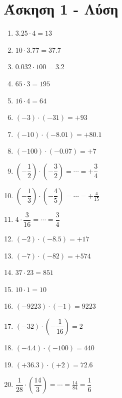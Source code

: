 \documentclass[a4paper,10pt]{report}
\begin{document}
\section*{Άσκηση 1  - Λύση \hfill \small{}}
\begin{multicols}{2}
\begin{enumerate}[1)]
 \item $3.25\cdot 4=13$
 \item $10\cdot 3.77=37.7$
 \item $0.032\cdot100=3.2$
 \item $65\cdot3=195$
 \item $16\cdot4=64$
 \item $(-3)\cdot(-31)=+93$
 \item $(-10)\cdot(-8.01)=+80.1$
 \item $(-100)\cdot(-0.07)=+7$
 \item $(-\dfrac{1}{2})\cdot(-\dfrac{3}{2})=\cdots=+\dfrac{3}{4}$
 \item $(-\dfrac{1}{3})\cdot(-\dfrac{4}{5})=\cdots=+\frac{4}{15}$
 \item $4\cdot\dfrac{3}{16}=\cdots=\dfrac{3}{4}$
 \item $(-2)\cdot(-8.5)=+17$
 \item $(-7)\cdot(-82)=+574$
 \item $37\cdot23=851$
 \item $10\cdot1=10$
 \item $(-9223)\cdot(-1)=9223$
 \item $(-32)\cdot(-\dfrac{1}{16})=2$
 \item $(-4.4)\cdot(-100)=440$
 \item $(+36.3)\cdot(+2)=72.6$
 \item $\dfrac{1}{28}\cdot(\dfrac{14}{3})=\cdots=\frac{14}{84}=\dfrac{1}{6}$
\end{enumerate}
\end{multicols}
\end{document}
